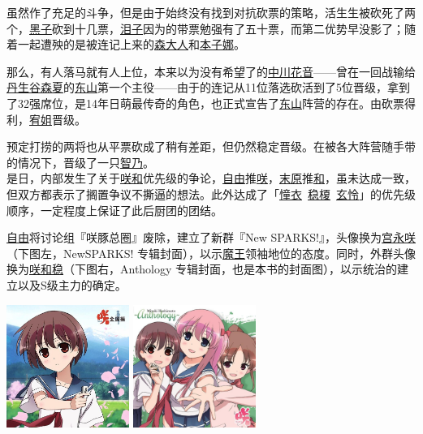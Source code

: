 虽然作了充足的斗争，但是由于始终没有找到对抗砍票的策略，活生生被砍死了两个，\uline{黑子}砍到十几票，\uline{泪子}因为的带票勉强有了五十票，而第二优势早没影了；随着一起遭殃的是被连记上来的\uline{森大人}和\uline{本子娜}。

那么，有人落马就有人上位，本来以为没有希望了的\uline{中川花音}——曾在一回战输给\uline{丹生谷森夏}的\uline{东山}第一个主役——由于的连记从11位落选砍活到了5位晋级，拿到了32强席位，是14年日萌最传奇的角色，也正式宣告了\uline{东山}阵营的存在。由砍票得利，\uline{宥姐}晋级。

预定打捞的两将也从平票砍成了稍有差距，但仍然稳定晋级。在被各大阵营随手带的情况下，晋级了一只\uline{智乃}。
\\[1em]

是日，内部发生了关于\uline{咲}\uline{和}优先级的争论，\uline{自由}推\uline{咲}，\uline{末原}推\uline{和}，虽未达成一致，但双方都表示了搁置争议不撕逼的想法。此外达成了「\uline{憧衣}~\uline{稳榎}~\uline{玄怜}」的优先级顺序，一定程度上保证了此后厨团的团结。

\uline{自由}将讨论组『咲豚总圈』废除，建立了新群『New SPARKS!』，头像换为\uline{宫永咲}（下图左，NewSPARKS! 专辑封面），以示\uline{魔王}领袖地位的态度。同时，外群头像换为\uline{咲}\uline{和}\uline{稳}（下图右，Anthology 专辑封面，也是本书的封面图），以示统治的建立以及S级主力的确定。

\begin{center}
\includegraphics[width=0.3\textwidth]{images/NewSPARKS.jpg}
\quad\quad\quad\quad
\includegraphics[width=0.3\textwidth]{images/Anthology.jpg}
\end{center}

